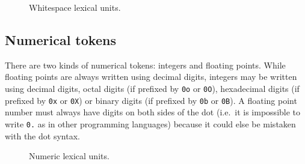 \begin{figure}[H]
  \centering


  \caption{Whitespace lexical units.}
  \label{fig:zilch-grammar-lexical-whitespaces-grammar}
\end{figure}

\subsection{Numerical tokens}\label{subsec:zilch-grammar-lexical-numbers}

There are two kinds of numerical tokens: integers and floating points.
While floating points are always written using decimal digits, integers may be written using decimal digits, octal digits (if prefixed by \verb|0o| or \verb|0O|), hexadecimal digits (if prefixed by \verb|0x| or \verb|0X|) or binary digits (if prefixed by \verb|0b| or \verb|0B|).
A floating point number must always have digits on both sides of the dot (i.e.\ it is impossible to write \verb|0.| as in other programming languages) because it could else be mistaken with the dot syntax.

\begin{figure}[H]
  \centering


  \caption{Numeric lexical units.}
  \label{fig:zilch-grammar-lexical-numbers-grammar}
\end{figure}
